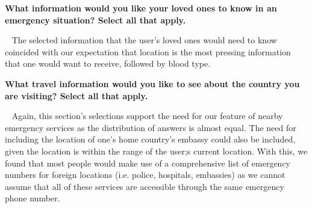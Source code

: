 \documentclass{scrreprt}
\begin{document}
\textbf{What information would you like your loved ones to know in an emergency situation? Select all that apply.}
\par ~ The selected information that the user's loved ones would need to know coincided with our expectation that location is the most pressing information that one would want to receive, followed by blood type.

\textbf{What travel information would you like to see about the country you are visiting? Select all that apply.}
\par ~ Again, this section's selections support the need for our feature of nearby emergency services as the distribution of answers is almost equal. The need for including the location of one's home country's embassy could also be included, given the location is within the range of the user;s current location. With this, we found that most people would make use of a comprehensive list of emergency numbers for foreign locations (i.e. police, hospitals, embassies) as we cannot assume that all of these services are accessible through the same emergency phone number.
\end{document}

